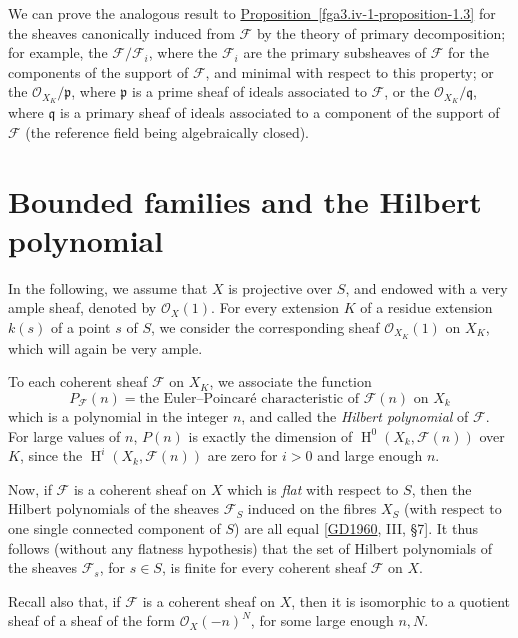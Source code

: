   We can prove the analogous result to \hyperref[fga3.iv-1-proposition-1.3]{Proposition~\ref*{fga3.iv-1-proposition-1.3}} for the sheaves canonically induced from \(\mathscr {F}\) by the theory of primary decomposition;
  for example, the \(\mathscr {F}/\mathscr {F}_i\), where the \(\mathscr {F}_i\) are the primary subsheaves of \(\mathscr {F}\) for the components of the support of \(\mathscr {F}\), and minimal with respect to this property;
  or the \(\mathcal {O}_{X_K}/\mathfrak {p}\), where \(\mathfrak {p}\) is a prime sheaf of ideals associated to \(\mathscr {F}\), or the \(\mathcal {O}_{X_K}/\mathfrak {q}\), where \(\mathfrak {q}\) is a primary sheaf of ideals associated to a component of the support of \(\mathscr {F}\) (the reference field being algebraically closed).\chapter{Bounded families and the Hilbert polynomial}\thispagestyle{fancy}\label{fga3.iv-2}\par{}In the following, we assume that \(X\) is projective over \(S\), and endowed with a very ample sheaf, denoted by \(\mathcal {O}_X(1)\).
  For every extension \(K\) of a residue extension \(k(s)\) of a point \(s\) of \(S\), we consider the corresponding sheaf \(\mathcal {O}_{X_K}(1)\) on \(X_K\), which will again be very ample.\par{}To each coherent sheaf \(\mathscr {F}\) on \(X_K\), we associate the function
  \[     P_\mathscr {F}(n)     = \text {the Euler–Poincaré characteristic of }\mathscr {F}(n)\text { on }X_k   \]
  which is a polynomial in the integer \(n\), and called the \emph{Hilbert polynomial} of \(\mathscr {F}\).
  For large values of \(n\), \(P(n)\) is exactly the dimension of \(\operatorname {H}^0(X_k,\mathscr {F}(n))\) over \(K\), since the \(\operatorname {H}^i(X_k,\mathscr {F}(n))\) are zero for \(i>0\) and large enough \(n\).\par{}Now, if \(\mathscr {F}\) is a coherent sheaf on \(X\) which is \emph{flat} with respect to \(S\), then the Hilbert polynomials of the sheaves \(\mathscr {F}_S\) induced on the fibres \(X_S\) (with respect to one single connected component of \(S\)) are all equal [\hyperref[GD1960]{GD1960}, III, §7].
  It thus follows (without any flatness hypothesis) that the set of Hilbert polynomials of the sheaves \(\mathscr {F}_s\), for \(s\in  S\), is finite for every coherent sheaf \(\mathscr {F}\) on \(X\).\par{}Recall also that, if \(\mathscr {F}\) is a coherent sheaf on \(X\), then it is isomorphic to a quotient sheaf of a sheaf of the form \(\mathcal {O}_X(-n)^N\), for some large enough \(n,N\).
